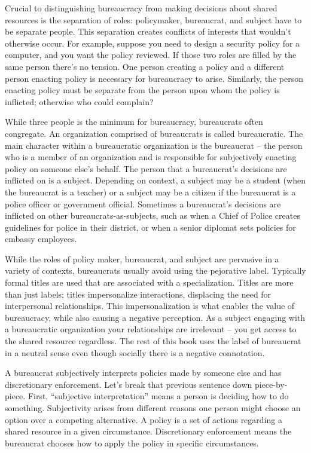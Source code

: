 Crucial to distinguishing bureaucracy from making decisions about shared resources is the separation of roles: policymaker, bureaucrat, and subject have to be separate people. This separation creates conflicts of interests that wouldn't otherwise occur. For example, suppose you need to design a security policy for a computer, and you want the policy reviewed. If those two roles are filled by the same person there's no tension. 
One person creating a policy and a different person enacting policy is necessary for bureaucracy to arise. Similarly, the person enacting policy must be separate from the person upon whom the policy is inflicted; otherwise who could complain?

While three people is the minimum for bureaucracy, bureaucrats often congregate. 
An organization comprised of bureaucrats is called bureaucratic.
The main character within a bureaucratic organization is the \gls{bureaucrat} -- the person who is a member of an organization and is responsible for subjectively enacting policy on someone else's behalf. The person that a bureaucrat's decisions are inflicted on is a \gls{subject}.  Depending on context, a subject may be a student (when the bureaucrat is a teacher)
or a subject may be a citizen if the bureaucrat is a police officer 
or government official. Sometimes a bureaucrat's decisions are inflicted on other bureaucrats-as-subjects, such as when a Chief of Police creates guidelines for police in their district, or when a senior diplomat sets policies for embassy employees. 

While the roles of policy maker, bureaucrat, and subject are pervasive in a variety of contexts, bureaucrats usually avoid using the pejorative label. Typically formal titles are used that are associated with a specialization. Titles are more than just labels; titles impersonalize interactions, displacing the need for interpersonal relationships. This impersonalization is what enables the value of bureaucracy, while also causing a negative perception. As a subject engaging with a bureaucratic organization your relationships are irrelevant -- you get access to the shared resource regardless. The rest of this book uses the label of bureaucrat in a neutral sense even though socially there is a negative connotation.  

A \gls{bureaucrat} \iftoggle{glossaryinmargin}{\marginpar{[Glossary]}}{}%
subjectively interprets policies made by someone else and has discretionary enforcement.  
Let's break that previous sentence down piece-by-piece. First, ``subjective interpretation'' means a person is deciding how to do something. Subjectivity arises from different reasons one person might choose an option over a competing alternative.  A \gls{policy} \iftoggle{glossaryinmargin}{\marginpar{[Glossary]}}{}%
is a set of actions regarding a shared resource in a given circumstance. 
Discretionary enforcement means the bureaucrat chooses how to apply the policy in specific circumstances. 

